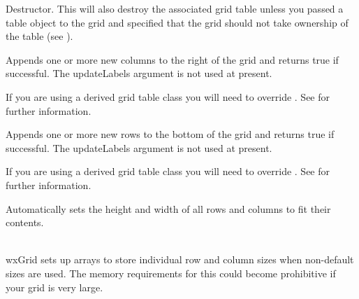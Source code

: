 
Destructor. This will also destroy the associated grid table unless you passed a table
object to the grid and specified that the grid should not take ownership of the
table (see ).



\label{wxgridappendcols}


Appends one or more new columns to the right of the grid and returns true if
successful. The updateLabels argument is not used at present.

If you are using a derived grid table class you will need to override
. See
 for further information.



\label{wxgridappendrows}


Appends one or more new rows to the bottom of the grid and returns true if
successful. The updateLabels argument is not used at present.

If you are using a derived grid table class you will need to override
. See
 for further information.



\label{wxgridautosize}


Automatically sets the height and width of all rows and columns to fit their contents.

\\
wxGrid sets up arrays to store individual row and column sizes when non-default sizes are used.
The memory requirements for this could become prohibitive if your grid is very large.



\label{wxgridautosizecollabelsize}


